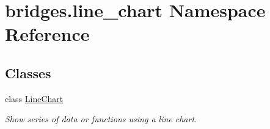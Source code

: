 \hypertarget{namespacebridges_1_1line__chart}{}\section{bridges.\+line\+\_\+chart Namespace Reference}
\label{namespacebridges_1_1line__chart}
\subsection*{Classes}
\begin{DoxyCompactItemize}
\item 
class \hyperlink{classbridges_1_1line__chart_1_1_line_chart}{Line\+Chart}
\begin{DoxyCompactList}\small\item\em Show series of data or functions using a line chart. \end{DoxyCompactList}\end{DoxyCompactItemize}

